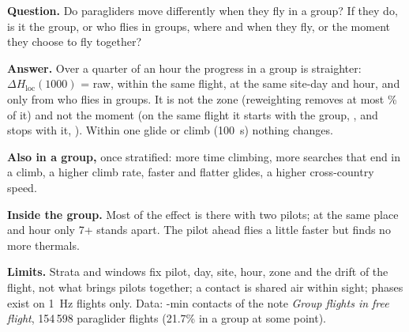 \begin{summary}
\textbf{Question.} Do paragliders move differently when they fly in a group? If they do, is it the group, or
who flies in groups, where and when they fly, or the moment they choose to fly together?

\textbf{Answer.} Over a quarter of an hour the progress in a group is straighter: $\Delta H_\mathrm{loc}(1000)$ =
\DHlocThousandRaw{} raw, \DHlocThousandFlight{} within the same flight, \DHlocThousandGroupSdh{} at the same site-day and
hour, and only \DHlocThousandSel{} from who flies in groups. It is not the zone (reweighting removes at most
\ZoneRedLocZoneHour\% of it) and not the moment (on the same flight it starts with the group, \PPEntryDHloc, and stops
with it, \PPExitDHloc). Within one glide or climb (100~s) nothing changes.

\textbf{Also in a group,} once stratified: more time climbing, more searches that end in a climb, a higher climb rate,
faster and flatter glides, a higher cross-country speed.

\textbf{Inside the group.} Most of the effect is there with two pilots; at the same place and hour only 7+ stands apart.
The pilot ahead flies a little faster but finds no more thermals.

\textbf{Limits.} Strata and windows fix pilot, day, site, hour, zone and the drift of the flight, not what brings pilots
together; a contact is shared air within sight; phases exist on 1~Hz flights only. Data: \tauStar-min contacts of the
note \emph{Group flights in free flight}, 154\,598 paraglider flights (21.7\% in a group at some point).
\end{summary}
